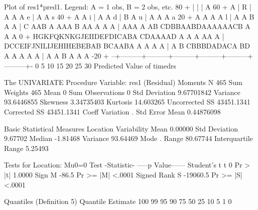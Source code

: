 \documentclass{article}
\begin{document}
\begin{Woutput}
       Plot of res1*pred1.  Legend: A = 1 obs, B = 2 obs, etc.
   80 +
      |
      |
      |                               A
   60 +                                A
      |
R     |                 A  A     A
e     |                   A         A
s  40 +                     A         A
i     |                                A       A
d     |               B       A
u     |  A          A      A
a  20 +            A  A     A              A
l     |         A       A          B         A    A
      |       C  AAB A   AAA  B  AA  A    A   A
      |  AAA  A AB CDBBAABDAAAAAACB   A       A     A
    0 + HGKFQKNKGJEIIDEFDICABA  CDAAAAD A A  A AA A
      |      DCCEIFJNILIJEHIHEBEBAB BCAABA A   A      A   A
      |                 A B CBBBDADACA  BD  A  A          A  A  A
      |                                A  A  B A     A   A
  -20 +
      --+---------+---------+---------+---------+---------+---------+-
        0         5        10        15        20        25        30
                         Predicted Value of timedrs












The UNIVARIATE Procedure
Variable:  res1  (Residual)
                            Moments
N                         465    Sum Weights                465
Mean                        0    Sum Observations             0
Std Deviation      9.67701842    Variance            93.6446855
Skewness           3.34735403    Kurtosis             14.603265
Uncorrected SS     43451.1341    Corrected SS        43451.1341
Coeff Variation             .    Std Error Mean      0.44876098

              Basic Statistical Measures
    Location                    Variability
Mean      0.00000     Std Deviation            9.67702
Median   -1.81468     Variance                93.64469
Mode       .          Range                   80.67744
                      Interquartile Range      5.25493

           Tests for Location: Mu0=0
Test           -Statistic-    -----p Value------
Student's t    t         0    Pr > |t|    1.0000
Sign           M     -86.5    Pr >= |M|   <.0001
Signed Rank    S  -19060.5    Pr >= |S|   <.0001

Quantiles (Definition 5)
Quantile        Estimate
100%
99%
95%
90%
75%
50%
25%
10%
5%
1%
0%


\end{Woutput}
\end{document}
